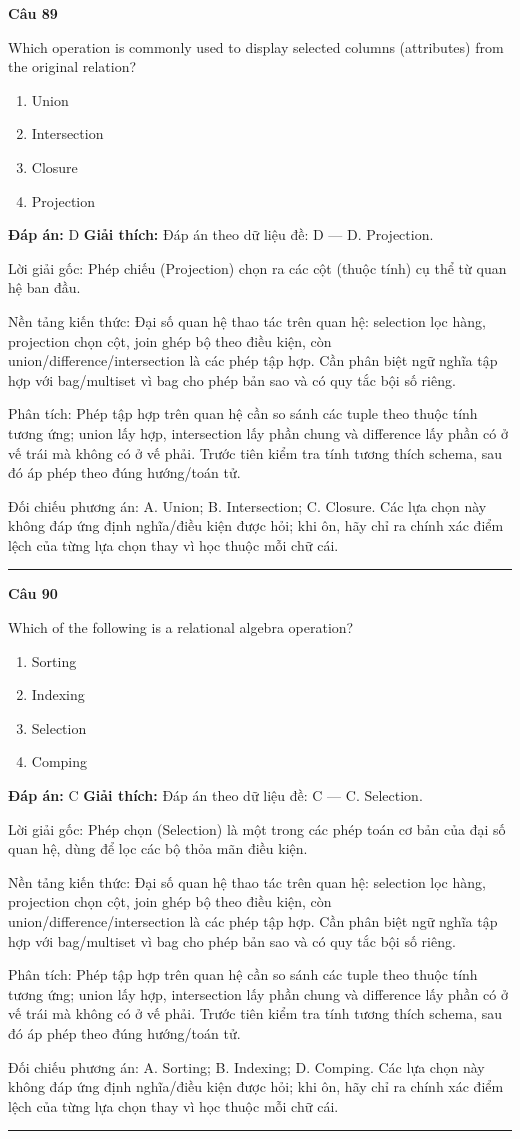 \documentclass[11pt,a4paper]{article}
\newenvironment{question}[1]{%
  \par\vspace{1em}\noindent\textbf{\large Câu #1}\par\vspace{0.4em}
}{%
  \par\vspace{1em}\hrule\vspace{0.6em}
}
\newenvironment{choices}{%
  \begin{enumerate}[label=\textbf{\Alph*.},leftmargin=2.2em,itemsep=2pt,topsep=3pt]
}{%
  \end{enumerate}
}
\newcommand{\choice}{\item}
\begin{document}
\begin{question}{89}
Which operation is commonly used to display selected columns (attributes) from the original relation?
\begin{choices}
\choice Union
\choice Intersection
\choice Closure
\choice Projection
\end{choices}
\textbf{Đáp án:} D
\textbf{Giải thích:} Đáp án theo dữ liệu đề: D — D. Projection.

Lời giải gốc: Phép chiếu (Projection) chọn ra các cột (thuộc tính) cụ thể từ quan hệ ban đầu.

Nền tảng kiến thức: Đại số quan hệ thao tác trên quan hệ: selection lọc hàng, projection chọn cột, join ghép bộ theo điều kiện, còn union/difference/intersection là các phép tập hợp. Cần phân biệt ngữ nghĩa tập hợp với bag/multiset vì bag cho phép bản sao và có quy tắc bội số riêng.

Phân tích: Phép tập hợp trên quan hệ cần so sánh các tuple theo thuộc tính tương ứng; union lấy hợp, intersection lấy phần chung và difference lấy phần có ở vế trái mà không có ở vế phải. Trước tiên kiểm tra tính tương thích schema, sau đó áp phép theo đúng hướng/toán tử.

Đối chiếu phương án: A. Union; B. Intersection; C. Closure. Các lựa chọn này không đáp ứng định nghĩa/điều kiện được hỏi; khi ôn, hãy chỉ ra chính xác điểm lệch của từng lựa chọn thay vì học thuộc mỗi chữ cái.
\end{question}

\begin{question}{90}
Which of the following is a relational algebra operation?
\begin{choices}
\choice Sorting
\choice Indexing
\choice Selection
\choice Comping
\end{choices}
\textbf{Đáp án:} C
\textbf{Giải thích:} Đáp án theo dữ liệu đề: C — C. Selection.

Lời giải gốc: Phép chọn (Selection) là một trong các phép toán cơ bản của đại số quan hệ, dùng để lọc các bộ thỏa mãn điều kiện.

Nền tảng kiến thức: Đại số quan hệ thao tác trên quan hệ: selection lọc hàng, projection chọn cột, join ghép bộ theo điều kiện, còn union/difference/intersection là các phép tập hợp. Cần phân biệt ngữ nghĩa tập hợp với bag/multiset vì bag cho phép bản sao và có quy tắc bội số riêng.

Phân tích: Phép tập hợp trên quan hệ cần so sánh các tuple theo thuộc tính tương ứng; union lấy hợp, intersection lấy phần chung và difference lấy phần có ở vế trái mà không có ở vế phải. Trước tiên kiểm tra tính tương thích schema, sau đó áp phép theo đúng hướng/toán tử.

Đối chiếu phương án: A. Sorting; B. Indexing; D. Comping. Các lựa chọn này không đáp ứng định nghĩa/điều kiện được hỏi; khi ôn, hãy chỉ ra chính xác điểm lệch của từng lựa chọn thay vì học thuộc mỗi chữ cái.
\end{question}
\end{document}
